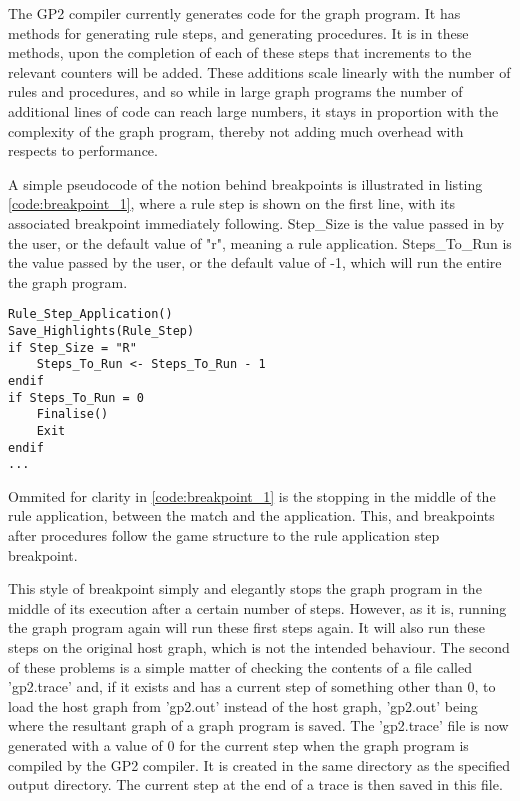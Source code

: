 \documentclass{UoYCSproject}
\begin{document}
The GP2 compiler currently generates code for the graph program. It has methods for generating rule steps, and generating procedures. It is in these methods, upon the completion of each of these steps that increments to the relevant counters will be added. These additions scale linearly with the number of rules and procedures, and so while in large graph programs the number of additional lines of code can reach large numbers, it stays in proportion with the complexity of the graph program, thereby not adding much overhead with respects to performance.

A simple pseudocode of the notion behind breakpoints is illustrated in listing \ref{code:breakpoint_1}, where a rule step is shown on the first line, with its associated breakpoint immediately following. Step\_Size is the value passed in by the user, or the default value of "r", meaning a rule application. Steps\_To\_Run is the value passed by the user, or the default value of -1, which will run the entire the graph program.

\begin{lstlisting}[label=code:breakpoint_1, caption=Pseudocode of breakpoints]
Rule_Step_Application()
Save_Highlights(Rule_Step)
if Step_Size = "R"
    Steps_To_Run <- Steps_To_Run - 1
endif
if Steps_To_Run = 0
    Finalise()
    Exit
endif
...
\end{lstlisting}

Ommited for clarity in \ref{code:breakpoint_1} is the stopping in the middle of the rule application, between the match and the application. This, and breakpoints after procedures follow the game structure to the rule application step breakpoint.

This style of breakpoint simply and elegantly stops the graph program in the middle of its execution after a certain number of steps. However, as it is, running the graph program again will run these first steps again. It will also run these steps on the original host graph, which is not the intended behaviour. The second of these problems is a simple matter of checking the contents of a file called 'gp2.trace' and, if it exists and has a current step of something other than 0, to load the host graph from 'gp2.out' instead of the host graph, 'gp2.out' being where the resultant graph of a graph program is saved. The 'gp2.trace' file is now generated with a value of 0 for the current step when the graph program is compiled by the GP2 compiler. It is created in the same directory as the specified output directory. The current step at the end of a trace is then saved in this file. 
\end{document}
